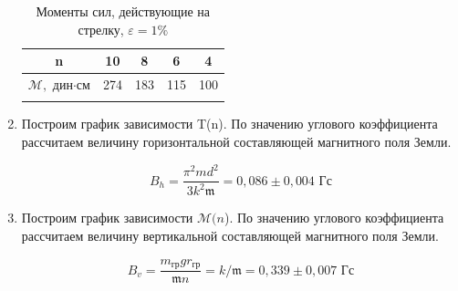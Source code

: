 \documentclass[a4paper, 12pt]{article}%
\begin{document}
\begin{enumerate}
		\begin{longtable} {|c|c|c|c|c|}
			\hline
			n &  10 & 8 & 6 & 4   \\ \hline
			$\mathcal M,$ дин$\cdot$см & 274 & 183 & 115 & 100 \\ \hline
			\caption{Моменты сил, действующие на стрелку, $\varepsilon = 1\% $}
		\end{longtable}
	
	\newpage
		
		
		\item Построим график зависимости T(n). По значению углового коэффициента рассчитаем величину горизонтальной составляющей магнитного поля Земли.
		
		$$ B_h = \dfrac{\pi^2 m d^2}{3k^2 \mathfrak m} = 0,086 \pm 0,004 \text{  Гс}$$
		
		\begin{figure}[H]
			\caption{}
		\end{figure}
		\newpage
		\item Построим график зависимости $\mathcal M(n$). По значению углового коэффициента рассчитаем величину вертикальной составляющей магнитного поля Земли.
		
		$$ B_v = \dfrac{ m_{\text{гр}}g r_{\text{гр}}}{\mathfrak m n} = k/\mathfrak m = 0,339 \pm 0,007\text{  Гс}$$
		

\end{enumerate}
\end{document}
